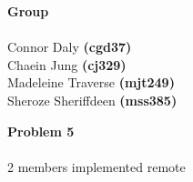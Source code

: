\documentclass{3110hw}
\begin{document}

\maketitle

\begin{exercises}
	\lstset{basicstyle=\ttfamily,columns=fullflexible,keepspaces=true}

\item[] \textbf{Group} \\ \\
Connor Daly \textbf{(cgd37)} \\
Chaein Jung \textbf{(cj329)} \\
Madeleine Traverse \textbf{(mjt249)} \\
Sheroze Sheriffdeen \textbf{(mss385)} \\

\item[] \textbf{Problem 5} \\ \\
2 members implemented remote

\end{exercises}
\end{document}

